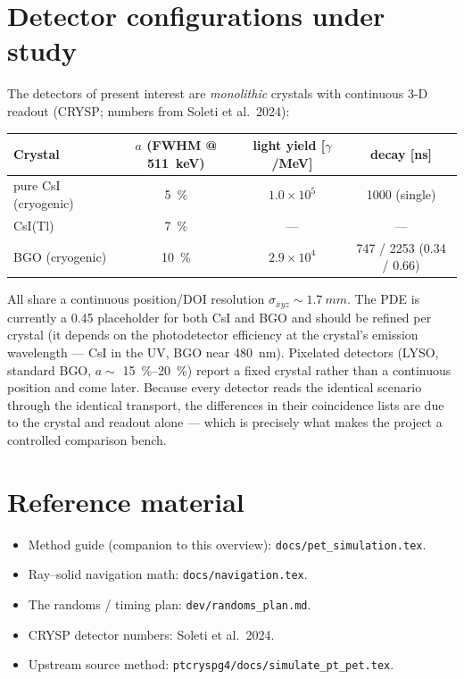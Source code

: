 \documentclass[11pt]{article}
\begin{document}
\section{Detector configurations under study}
\label{sec:configs}

The detectors of present interest are \emph{monolithic} crystals with continuous \mbox{3-D}
readout (CRYSP; numbers from Soleti et al.\ 2024):
\begin{center}
\begin{tabular}{lccc}
\hline
Crystal & $a$ (FWHM @ \SI{511}{keV}) & light yield [$\gamma$/MeV] & decay [\si{ns}] \\
\hline
pure CsI (cryogenic) & \SI{5}{\percent}  & $1.0\times10^5$ & 1000 (single) \\
CsI(Tl)              & \SI{7}{\percent}  & --- & --- \\
BGO (cryogenic)      & \SI{10}{\percent} & $2.9\times10^4$ & 747 / 2253 (0.34 / 0.66) \\
\hline
\end{tabular}
\end{center}
All share a continuous position/DOI resolution $\sigma_{xyz}\sim\SI{1.7}{mm}$. The PDE is
currently a \num{0.45} placeholder for both CsI and BGO and should be refined per crystal
(it depends on the photodetector efficiency at the crystal's emission wavelength --- CsI in
the UV, BGO near \SI{480}{nm}). Pixelated detectors (LYSO, standard BGO, $a\sim$
\SIrange{15}{20}{\percent}) report a fixed crystal rather than a continuous position and come
later. Because every detector reads the identical scenario through the identical transport,
the differences in their coincidence lists are due to the crystal and readout alone --- which
is precisely what makes the project a controlled comparison bench.

\section*{Reference material}
\begin{itemize}[nosep]
\item Method guide (companion to this overview): \texttt{docs/pet\_simulation.tex}.
\item Ray--solid navigation math: \texttt{docs/navigation.tex}.
\item The randoms / timing plan: \texttt{dev/randoms\_plan.md}.
\item CRYSP detector numbers: Soleti et al.\ 2024.
\item Upstream source method: \texttt{ptcryspg4/docs/simulate\_pt\_pet.tex}.
\end{itemize}
\end{document}
